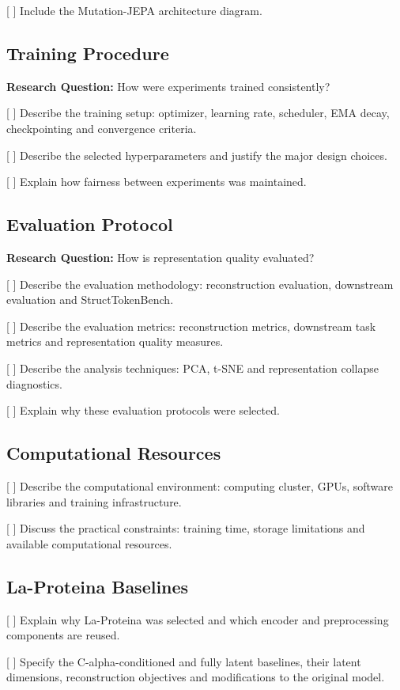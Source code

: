 [ ] Include the Mutation-JEPA architecture diagram.

\subsection{Training Procedure}
\textbf{Research Question:} How were experiments trained consistently?

[ ] Describe the training setup: optimizer, learning rate, scheduler, EMA decay, checkpointing and convergence criteria.

[ ] Describe the selected hyperparameters and justify the major design choices.

[ ] Explain how fairness between experiments was maintained.

\subsection{Evaluation Protocol}
\textbf{Research Question:} How is representation quality evaluated?

[ ] Describe the evaluation methodology: reconstruction evaluation, downstream evaluation and StructTokenBench.

[ ] Describe the evaluation metrics: reconstruction metrics, downstream task metrics and representation quality measures.

[ ] Describe the analysis techniques: PCA, t-SNE and representation collapse diagnostics.

[ ] Explain why these evaluation protocols were selected.

\subsection{Computational Resources}

[ ] Describe the computational environment: computing cluster, GPUs, software libraries and training infrastructure.

[ ] Discuss the practical constraints: training time, storage limitations and available computational resources.


\subsection{La-Proteina Baselines}

[ ] Explain why La-Proteina was selected and which encoder
and preprocessing components are reused.

[ ] Specify the C-alpha-conditioned and fully latent baselines,
their latent dimensions, reconstruction objectives and
modifications to the original model.


